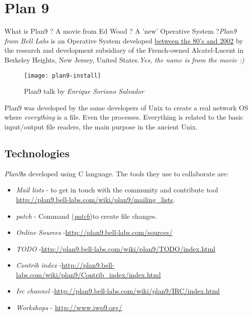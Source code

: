 \section{Plan 9}
\label{sec:plan9}

\par What is Plan9 ? A movie from Ed Wood ? A 'new' Operative System ?\textit{Plan9 from Bell Labs} is an Operative System developed \href{http://swtch.com/plan9history/}{between the 80's and 2002} by the research and development subsidiary of the French-owned Alcatel-Lucent in Berkeley Heights, New Jersey, United States.\textit{Yes, the name is from the movie :)}

\begin{figure}[H]
\centering
\texttt{[image: plan9-install]}
\caption{Plan9 talk by \textit{Enrique Soriano Salvador}}
\label{plan9-film}
\end{figure}

\par Plan9 was developed by the same developers of Unix to create a real network OS where \textit{everything} is a file. Even the processes. Everything is related to the basic input/output file readers, the main purpose in the ancient Unix.

\subsection{Technologies}

\textit{Plan9}is developed using C language. The tools they use to collaborate are:
\begin{itemize}
	\item \textit{Mail lists} - to get in touch with the community and contribute tool \url{http://plan9.bell-labs.com/wiki/plan9/mailing_lists}.
	\item \textit{patch} - Command (\href{http://plan9.bell-labs.com/magic/man2html/1/patch}{\textit{patch}})to create file changes.
	\item \textit{Online Sources} -\url{http://plan9.bell-labs.com/sources/}
	\item \textit{TODO} -\url{http://plan9.bell-labs.com/wiki/plan9/TODO/index.html}
	\item \textit{Contrib index} -\url{http://plan9.bell-labs.com/wiki/plan9/Contrib_index/index.html}
	\item \textit{Irc channel} -\url{http://plan9.bell-labs.com/wiki/plan9/IRC/index.html}
	\item \textit{Workshops} - \url{http://www.iwp9.org/}
\end{itemize}

